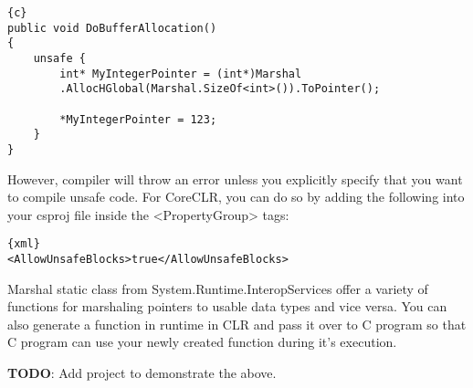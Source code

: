 \begin{lstlisting}{c}
public void DoBufferAllocation()
{
	unsafe {
		int* MyIntegerPointer = (int*)Marshal
		.AllocHGlobal(Marshal.SizeOf<int>()).ToPointer();
		
		*MyIntegerPointer = 123;
	}
}
\end{lstlisting}

However, compiler will throw an error unless you explicitly specify that you want to compile unsafe code. For CoreCLR, you can do so by adding the following into your csproj file inside the  <PropertyGroup> tags:

\begin{lstlisting}{xml}
<AllowUnsafeBlocks>true</AllowUnsafeBlocks>
\end{lstlisting}
\newpage
Marshal static class from System.Runtime.InteropServices offer a variety of functions for marshaling pointers to usable data types and vice versa. You can also generate a function in runtime in CLR and pass it over to C program so that C program can use your newly created function during it's execution.

\textbf{TODO}: Add project to demonstrate the above.